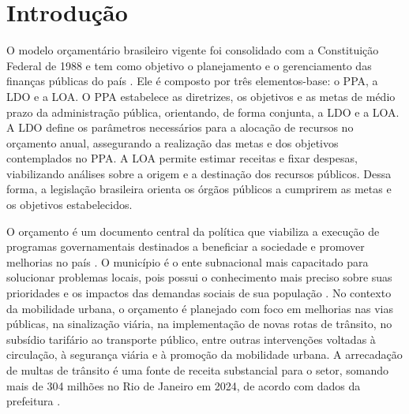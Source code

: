 \documentclass[12pt]{tcc}
\begin{document}

\dtables

\justifying

\chapter{Introdução}
\label{sec:introducao}

O modelo orçamentário brasileiro vigente foi consolidado com a Constituição Federal de 1988 e tem como objetivo o planejamento e o gerenciamento das finanças públicas do país \citep{deputados_constituicao_2025}. Ele é composto por três elementos-base: o \gls{PPA}, a \gls{LDO} e a \gls{LOA}. O \gls{PPA} estabelece as diretrizes, os objetivos e as metas de médio prazo da administração pública, orientando, de forma conjunta, a \gls{LDO} e a \gls{LOA}. A \gls{LDO} define os parâmetros necessários para a alocação de recursos no orçamento anual, assegurando a realização das metas e dos objetivos contemplados no \gls{PPA}. A \gls{LOA} permite estimar receitas e fixar despesas, viabilizando análises sobre a origem e a destinação dos recursos públicos. Dessa forma, a legislação brasileira orienta os órgãos públicos a cumprirem as metas e os objetivos estabelecidos.

O orçamento é um documento central da política que viabiliza a execução de programas governamentais destinados a beneficiar a sociedade e promover melhorias no país \citep{speeden_fatores_2019}. O município é o ente subnacional mais capacitado para solucionar problemas locais, pois possui o conhecimento mais preciso sobre suas prioridades e os impactos das demandas sociais de sua população \citep{louzano_causalidade_2019}. No contexto da mobilidade urbana, o orçamento é planejado com foco em melhorias nas vias públicas, na sinalização viária, na implementação de novas rotas de trânsito, no subsídio tarifário ao transporte público, entre outras intervenções voltadas à circulação, à segurança viária e à promoção da mobilidade urbana. A arrecadação de multas de trânsito é uma fonte de receita substancial para o setor, somando mais de 304 milhões no Rio de Janeiro em 2024, de acordo com dados da prefeitura \citep{limaNetoRJMultasArrecadacaoGlobo}.
\end{document}
